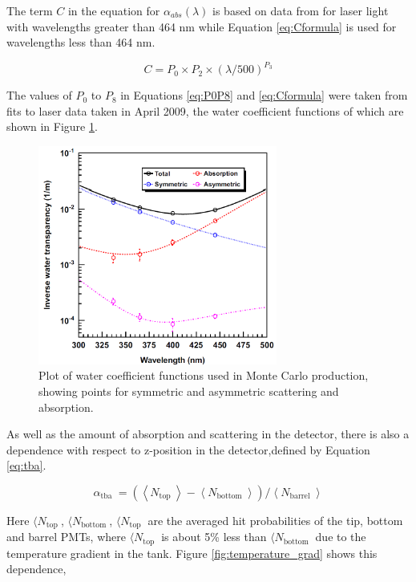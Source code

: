 The term $C$ in the equation for $\alpha_{abs}(\lambda)$ is based on data from \cite{Pope:97} for laser light with wavelengths greater than 464 nm while Equation \ref{eq:Cformula} is used for wavelengths less than 464 nm. 

\begin{equation}
C=P_{0} \times P_{2} \times(\lambda / 500)^{P_{3}}
\label{eq:Cformula}
\end{equation}

The values of $P_{0}$ to $P_{8}$ in Equations \ref{eq:P0P8} and \ref{eq:Cformula} were taken from fits to laser data taken in April 2009, the water coefficient functions of which are shown in Figure \ref{fig:water_coeff_plot}. 

\begin{figure}
    \centering
    \includegraphics[width=0.7\textwidth]{Figures/water_coeff_plot.png}
    \caption{Plot of water coefficient functions used in Monte Carlo production, showing points for symmetric and asymmetric scattering and absorption.}
    \label{fig:water_coeff_plot}
\end{figure}

As well as the amount of absorption and scattering in the detector, there is also a dependence with respect to z-position in the detector,defined by Equation \ref{eq:tba}.

\begin{equation}
    \alpha_{\text {tba }}=\left(\left\langle N_{\text {top }}\right\rangle-\left\langle N_{\text {bottom }}\right\rangle\right) /\left\langle N_{\text {barrel }}\right\rangle
    \label{eq:tba}   
\end{equation}

Here $\langle N_{\text {top }}$, $\langle N_{\text {bottom }}$, $\langle N_{\text {top }}$  are the averaged hit probabilities of the tip, bottom and barrel PMTs, where  $\langle N_{\text {top }}$ is about 5\% less than $\langle N_{\text {bottom }}$ due to the temperature gradient in the tank. Figure \ref{fig:temperature_grad} shows this dependence, 

